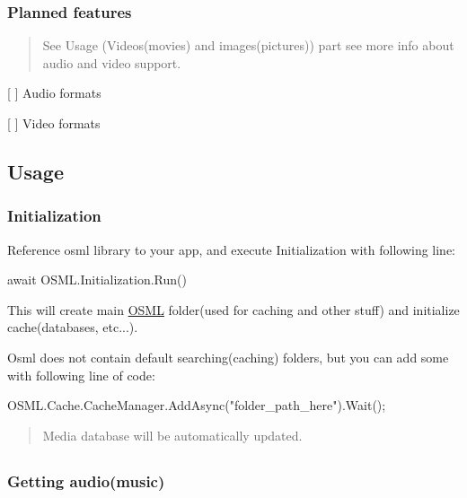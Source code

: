 \subsubsection*{Planned features}

\begin{quote}
See Usage (Videos(movies) and images(pictures)) part see more info about audio and video support. \end{quote}

\begin{DoxyItemize}
\item \mbox{[} \mbox{]} Audio formats
\item \mbox{[} \mbox{]} Video formats
\end{DoxyItemize}

\subsection*{Usage}

\subsubsection*{Initialization}

Reference osml library to your app, and execute Initialization with following line\+:

\begin{DoxyVerb}await OSML.Initialization.Run()
\end{DoxyVerb}


This will create main \mbox{\hyperlink{namespaceOSML}{O\+S\+ML}} folder(used for caching and other stuff) and initialize cache(databases, etc...).

Osml does not contain default searching(caching) folders, but you can add some with following line of code\+: \begin{DoxyVerb}OSML.Cache.CacheManager.AddAsync("folder_path_here").Wait();
\end{DoxyVerb}


\begin{quote}
Media database will be automatically updated. \end{quote}


\subsection*{}

\subsubsection*{Getting audio(music)}

